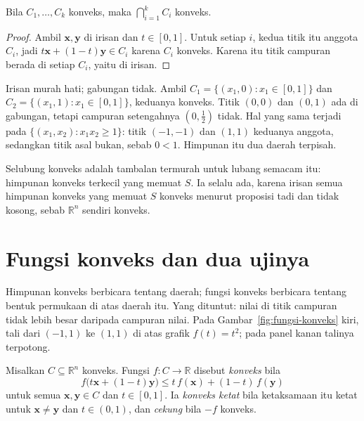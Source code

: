 \begin{proposisi}
Bila $C_{1},\dots,C_{k}$ konveks, maka $\bigcap_{i=1}^{k}C_{i}$ konveks.
\end{proposisi}

\begin{proof}
Ambil $\mathbf{x},\mathbf{y}$ di irisan dan $t\in[0,1]$. Untuk setiap $i$, kedua titik
itu anggota $C_{i}$, jadi $t\mathbf{x}+(1-t)\mathbf{y}\in C_{i}$ karena $C_{i}$ konveks.
Karena itu titik campuran berada di setiap $C_{i}$, yaitu di irisan.
\end{proof}

Irisan murah hati; gabungan tidak. Ambil $C_{1}=\{(x_{1},0):x_{1}\in[0,1]\}$ dan
$C_{2}=\{(x_{1},1):x_{1}\in[0,1]\}$, keduanya konveks. Titik $(0,0)$ dan $(0,1)$ ada di
gabungan, tetapi campuran setengahnya $(0,\tfrac12)$ tidak. Hal yang sama terjadi pada
$\{(x_{1},x_{2}):x_{1}x_{2}\ge1\}$: titik $(-1,-1)$ dan $(1,1)$ keduanya anggota,
sedangkan titik asal bukan, sebab $0<1$. Himpunan itu dua daerah terpisah.

Selubung konveks adalah tambalan termurah untuk lubang semacam itu: himpunan konveks
terkecil yang memuat $S$. Ia selalu ada, karena irisan semua himpunan konveks yang memuat
$S$ konveks menurut proposisi tadi dan tidak kosong, sebab $\mathbb{R}^{n}$ sendiri
konveks.

\section{Fungsi konveks dan dua ujinya}

Himpunan konveks berbicara tentang daerah; fungsi konveks berbicara tentang bentuk
permukaan di atas daerah itu. Yang dituntut: nilai di titik campuran tidak lebih besar
daripada campuran nilai. Pada Gambar~\ref{fig:fungsi-konveks} kiri, tali dari $(-1,1)$ ke
$(1,1)$ di atas grafik $f(t)=t^{2}$; pada panel kanan talinya terpotong.


\begin{definisi}
Misalkan $C\subseteq\mathbb{R}^{n}$ konveks. Fungsi $f\colon C\to\mathbb{R}$ disebut
\emph{konveks} bila
\[
  f\bigl(t\mathbf{x}+(1-t)\mathbf{y}\bigr)
  \le t\,f(\mathbf{x})+(1-t)\,f(\mathbf{y})
\]
untuk semua $\mathbf{x},\mathbf{y}\in C$ dan $t\in[0,1]$. Ia \emph{konveks ketat} bila
ketaksamaan itu ketat untuk $\mathbf{x}\ne\mathbf{y}$ dan $t\in(0,1)$, dan \emph{cekung}
bila $-f$ konveks.
\end{definisi}

